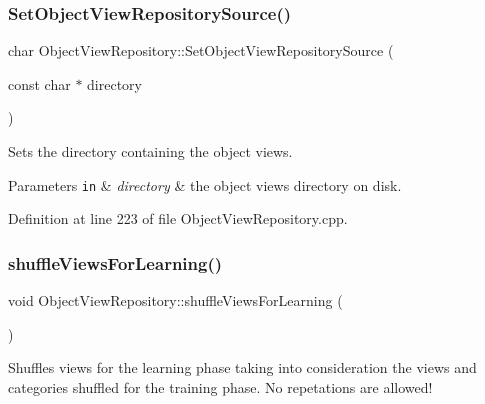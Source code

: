 \mbox{\label{class_object_view_repository_adceeb33508a5e48f32c304d84a84313b}} 
\subsubsection{\texorpdfstring{Set\+Object\+View\+Repository\+Source()}{SetObjectViewRepositorySource()}}
{\footnotesize\ttfamily char Object\+View\+Repository\+::\+Set\+Object\+View\+Repository\+Source (\begin{DoxyParamCaption}\item[{const char $\ast$}]{directory }\end{DoxyParamCaption})}

Sets the directory containing the object views.


\begin{DoxyParams}[1]{Parameters}
\mbox{\tt in}  & {\em directory} & the object views directory on disk. \\
\hline
\end{DoxyParams}


Definition at line 223 of file Object\+View\+Repository.\+cpp.

\mbox{\label{class_object_view_repository_ab82bb5b777885bc5900ca9ba55eabbd6}} 
\subsubsection{\texorpdfstring{shuffle\+Views\+For\+Learning()}{shuffleViewsForLearning()}}
{\footnotesize\ttfamily void Object\+View\+Repository\+::shuffle\+Views\+For\+Learning (\begin{DoxyParamCaption}{ }\end{DoxyParamCaption})}

Shuffles views for the learning phase taking into consideration the views and categories shuffled for the training phase. No repetations are allowed! 

